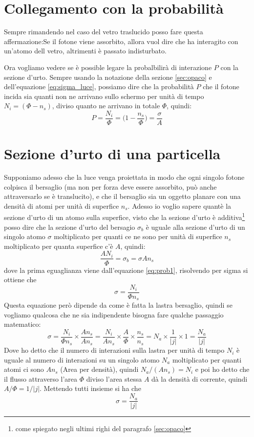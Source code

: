 \documentclass[11pt,a4paper]{article}
\begin{document}
	\section{Collegamento con la probabilità}
		Sempre rimandendo nel caso del vetro traslucido posso fare questa affermazione:Se il fotone viene assorbito, allora vuol dire che ha interagito con un'atomo dell vetro, altrimenti è passato indisturbato.\newline

		Ora vogliamo vedere se è possible legare la probalbilirà di interazione $P$ con la sezione d'urto.\newline
		Sempre usando la notazione della sezione \ref{sec:opaco} e dell'equazione \ref{eq:sigma_luce}, possiamo dire che la probabilità $P$ che il fotone incida sia quanti non ne arrivano sullo schermo per unità di tempo $N_i=(\Phi-n_s)$, diviso quanto ne arrivano in totale $\Phi$, quindi:
		\begin{equation}
			P=\frac {N_i} \Phi=\Big(1-\frac {n_s}\Phi\Big)=\frac\sigma A
			\label{eq:prob1}
		\end{equation}

	\section{Sezione d'urto di una particella}
		Supponiamo adesso che la luce venga proiettata in modo che ogni singolo fotone colpisca il bersaglio (ma non per forza deve essere assorbito, può anche attraversarlo se è translucito), e che il bersaglio sia un oggetto planare con una densità di atomi per unità di superfice $n_s$.\newline
		Adesso io voglio sapere quantè la sezione d'urto di un atomo sulla superfice, visto che la sezione d'urto è additiva\footnote{come spiegato negli ultimi righi del paragrafo \ref{sec:opaco}} posso dire che la sezione d'urto del bersagio $\sigma_b$ è uguale alla sezione d'urto di un singolo atomo $\sigma$ moltiplicato per quanti ce ne sono per unità di superfice $n_s$ moltiplicato per quanta superfice c'è $A$, quindi:
		\[
			\frac{AN_i}\Phi=\sigma_b=\sigma A n_s
		\]
		dove la prima eguaglianza viene dall'equazione \ref{eq:prob1}, risolvendo per sigma si ottiene che 
		\begin{equation}
			\sigma=\frac{N_i}{\Phi n_s}
		\end{equation}
		Questa equazione però dipende da come è fatta la lastra bersaglio, quindi se vogliamo qualcosa che ne sia indipendente bisogna fare qualche passaggio matematico:
		\[
			\sigma=\frac{N_i}{\Phi n_s}\times \frac{An_s}{An_s}=
			\frac{N_i}{An_s}\times\frac A\Phi\times \frac {n_s}{n_s}=
			N_a\times \frac1{|j|}\times 1=\frac{N_a}{|j|}
		\]
		Dove ho detto che il numero di interazioni sulla lastra per unità di tempo $N_i$ è uguale al numero di interazioni su un singolo atomo $N_a$ moltiplicato per quanti atomi ci sono $An_s$ (Area per densità), quindi $N_a/(An_s)=N_i$ e poi ho detto che il flusso attraverso l'area $\Phi$ diviso l'area stessa $A$ dà la densità di corrente, quindi $A/\Phi=1/|j|$.\newline
		Mettendo tutti insieme si ha che 
		\begin{equation}
			\sigma=\frac{N_a}{|j|}
		\end{equation}


		
\end{document}
